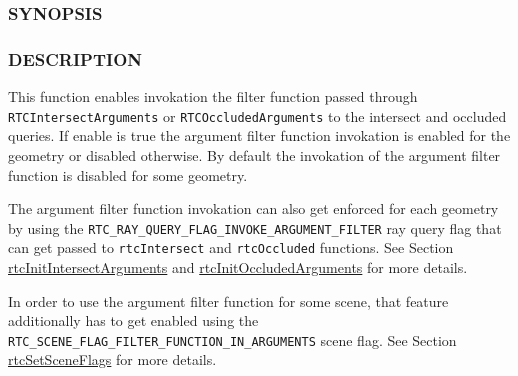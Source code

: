 \begin{Shaded}
\begin{Highlighting}[]
\OperatorTok{{-}}
\end{Highlighting}
\end{Shaded}

\subsubsection{SYNOPSIS}\label{synopsis}

\begin{Shaded}
\begin{Highlighting}[]

\OperatorTok{(}
\OperatorTok{,} \OperatorTok{);}
\end{Highlighting}
\end{Shaded}

\subsubsection{DESCRIPTION}\label{description}

This function enables invokation the filter function passed through
\texttt{RTCIntersectArguments} or \texttt{RTCOccludedArguments} to the
intersect and occluded queries. If enable is true the argument filter
function invokation is enabled for the geometry or disabled otherwise.
By default the invokation of the argument filter function is disabled
for some geometry.

The argument filter function invokation can also get enforced for each
geometry by using the
\texttt{RTC\_RAY\_QUERY\_FLAG\_INVOKE\_ARGUMENT\_FILTER} ray query flag
that can get passed to \texttt{rtcIntersect} and \texttt{rtcOccluded}
functions. See Section
\hyperref[rtcinitintersectarguments]{rtcInitIntersectArguments} and
\hyperref[rtcinitoccludedarguments]{rtcInitOccludedArguments} for more
details.

In order to use the argument filter function for some scene, that
feature additionally has to get enabled using the
\texttt{RTC\_SCENE\_FLAG\_FILTER\_FUNCTION\_IN\_ARGUMENTS} scene flag.
See Section \hyperref[rtcsetsceneflags]{rtcSetSceneFlags} for more
details.

